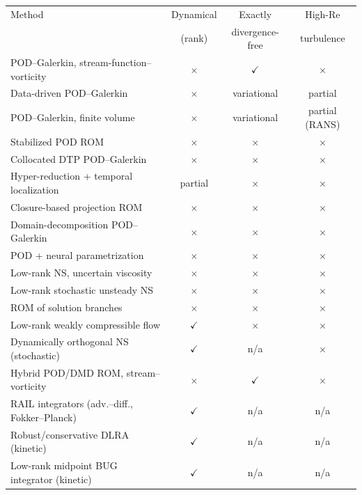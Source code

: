 \begin{table}[h]
\centering
\small
\begin{tabular}{@{}lccc@{}}
\toprule
Method & Dynamical & Exactly & High-Re \\
       & (rank) & divergence-free & turbulence \\
\midrule
POD--Galerkin, stream-function--vorticity \cite{girfoglio2022pod} & $\times$ & $\checkmark$ & $\times$ \\
Data-driven POD--Galerkin \cite{hijazi2020} & $\times$ & variational & partial \\
POD--Galerkin, finite volume \cite{loorenzi2016} & $\times$ & variational & partial (RANS) \\
Stabilized POD ROM \cite{siena2024} & $\times$ & $\times$ & $\times$ \\
Collocated DTP POD--Galerkin \cite{star2021} & $\times$ & $\times$ & $\times$ \\
Hyper-reduction + temporal localization \cite{klein2023} & partial & $\times$ & $\times$ \\
Closure-based projection ROM \cite{prakash2024} & $\times$ & $\times$ & $\times$ \\
Domain-decomposition POD--Galerkin \cite{prusak2023} & $\times$ & $\times$ & $\times$ \\
POD + neural parametrization \cite{kim2023,kochkov2021} & $\times$ & $\times$ & $\times$ \\
Low-rank NS, uncertain viscosity \cite{lee2017} & $\times$ & $\times$ & $\times$ \\
Low-rank stochastic unsteady NS \cite{elman2019low} & $\times$ & $\times$ & $\times$ \\
ROM of solution branches \cite{olshanskii2024} & $\times$ & $\times$ & $\times$ \\
Low-rank weakly compressible flow \cite{einkemmer2018} & $\checkmark$ & $\times$ & $\times$ \\
Dynamically orthogonal NS (stochastic) \cite{musharbash2018} & $\checkmark$ & n/a & $\times$ \\
Hybrid POD/DMD ROM, stream--vorticity \cite{zhang2024} & $\times$ & $\checkmark$ & $\times$ \\
RAIL integrators (adv.--diff., Fokker--Planck) \cite{rail2025} & $\checkmark$ & n/a & n/a \\
Robust/conservative DLRA (kinetic) \cite{einkemmer2023} & $\checkmark$ & n/a & n/a \\
Low-rank midpoint BUG integrator (kinetic) \cite{ceruti2024} & $\checkmark$ & n/a & n/a \\

\end{tabular}
\end{table}
